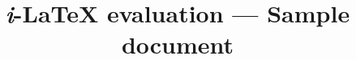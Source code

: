 \documentclass[acmsmall, nonacm]{acmart}
\DeclareRobustCommand{\iLaTeX}{\mbox{{{\itshape i}-\hspace{-0.25mm}}\LaTeX{}}}
\begin{document}
\title{\iLaTeX{} evaluation --- Sample document \docone}

\maketitle

\end{document}

